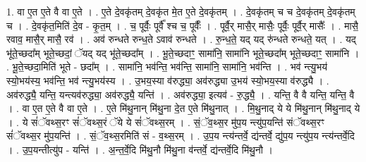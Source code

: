 \documentclass[17pt]{extarticle}
\begin{document}
1. वा ए॒त ए॒ते वै वा ए॒ते । . ए॒ते दे॒वकृ॑तम् दे॒वकृ॑त मे॒त ए॒ते दे॒वकृ॑तम् । . दे॒वकृ॑तम् च च दे॒वकृ॑तम् दे॒वकृ॑तम् च । . दे॒वकृ॑त॒मिति॑ दे॒व - कृ॒त॒म् । . च॒ पूर्वैः॒ पूर्वै᳚ श्च च॒ पूर्वैः᳚ । . पूर्वै॒र् मासै॒र् मासैः॒ पूर्वैः॒ पूर्वै॒र् मासैः᳚ । . मासै॒ रवाव॒ मासै॒र् मासै॒ रव॑ । . अव॑ रुन्धते रुन्ध॒ते ऽवाव॑ रुन्धते । . रु॒न्ध॒ते॒ यद् यद् रु॑न्धते रुन्धते॒ यत् । . यद् भू॑ते॒च्छदा᳚म् भूते॒च्छदां॒ ॅयद् यद् भू॑ते॒च्छदा᳚म् । . भू॒ते॒च्छदाꣳ॒॒ सामा॑नि॒ सामा॑नि भूते॒च्छदा᳚म् भूते॒च्छदाꣳ॒॒ सामा॑नि । . भू॒ते॒च्छदा॒मिति॑ भूते - छदा᳚म् । . सामा॑नि॒ भव॑न्ति॒ भव॑न्ति॒ सामा॑नि॒ सामा॑नि॒ भव॑न्ति । . भव॑ न्त्यु॒भय॑ स्यो॒भय॑स्य॒ भव॑न्ति॒ भव॑ न्त्यु॒भय॑स्य । . उ॒भय॒स्या व॑रुद्ध्या॒ अव॑रुद्ध्या उ॒भय॑ स्यो॒भय॒स्या व॑रुद्ध्यै । . अव॑रुद्ध्यै॒ यन्ति॒ यन्त्यव॑रुद्ध्या॒ अव॑रुद्ध्यै॒ यन्ति॑ । . अव॑रुद्ध्या॒ इत्यव॑ - रु॒द्ध्यै॒ । . यन्ति॒ वै वै यन्ति॒ यन्ति॒ वै । . वा ए॒त ए॒ते वै वा ए॒ते । . ए॒ते मि॑थु॒नान् मि॑थु॒ना दे॒त ए॒ते मि॑थु॒नात् । . मि॒थु॒नाद् ये ये मि॑थु॒नान् मि॑थु॒नाद् ये । . ये सं॑ॅवथ्स॒रꣳ सं॑ॅवथ्स॒रं ॅये ये सं॑ॅवथ्स॒रम् । . सं॒ॅव॒थ्स॒र मु॑प॒य न्त्यु॑प॒यन्ति॑ संॅवथ्स॒रꣳ सं॑ॅवथ्स॒र मु॑प॒यन्ति॑ । . सं॒ॅव॒थ्स॒रमिति॑ सं - व॒थ्स॒रम् । . उ॒प॒य न्त्य॑न्तर्वे॒ द्य॑न्तर्वे॒ द्यु॑प॒य न्त्यु॑प॒य न्त्य॑न्तर्वे॒दि । . उ॒प॒यन्तीत्यु॑प - यन्ति॑ । . अ॒न्त॒र्वे॒दि मि॑थु॒नौ मि॑थु॒ना व॑न्तर्वे॒ द्य॑न्तर्वे॒दि मि॑थु॒नौ । \newline
\end{document}
